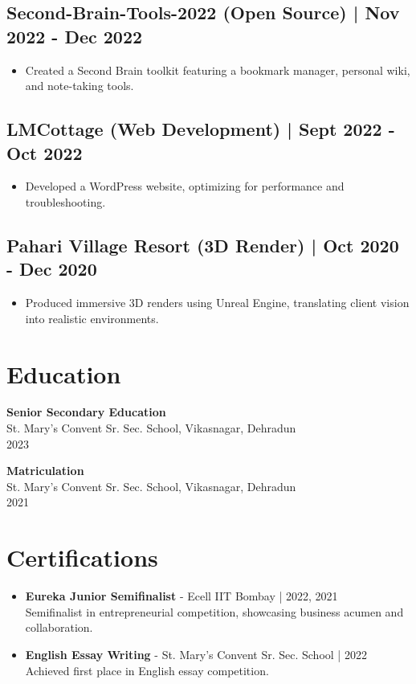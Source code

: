 \documentclass[a4paper,10pt]{article}
\begin{document}
\subsection*{Second-Brain-Tools-2022 (Open Source) | Nov 2022 - Dec 2022}
\begin{itemize}[left=0em, itemsep=3pt]
    \item Created a Second Brain toolkit featuring a bookmark manager, personal wiki, and note-taking tools.
\end{itemize}

\subsection*{LMCottage (Web Development) | Sept 2022 - Oct 2022}
\begin{itemize}[left=0em, itemsep=3pt]
    \item Developed a WordPress website, optimizing for performance and troubleshooting.
\end{itemize}

\subsection*{Pahari Village Resort (3D Render) | Oct 2020 - Dec 2020}
\begin{itemize}[left=0em, itemsep=3pt]
    \item Produced immersive 3D renders using Unreal Engine, translating client vision into realistic environments.
\end{itemize}

\section*{Education}
\noindent
\textbf{Senior Secondary Education} \\
St. Mary's Convent Sr. Sec. School, Vikasnagar, Dehradun \\
2023

\noindent
\textbf{Matriculation} \\
St. Mary's Convent Sr. Sec. School, Vikasnagar, Dehradun \\
2021

\section*{Certifications}
\begin{itemize}[left=0em, itemsep=3pt]
    \item \textbf{Eureka Junior Semifinalist} - Ecell IIT Bombay | 2022, 2021 \\
    Semifinalist in entrepreneurial competition, showcasing business acumen and collaboration.
    \item \textbf{English Essay Writing} - St. Mary's Convent Sr. Sec. School | 2022 \\
    Achieved first place in English essay competition.
\end{itemize}
\end{document}
